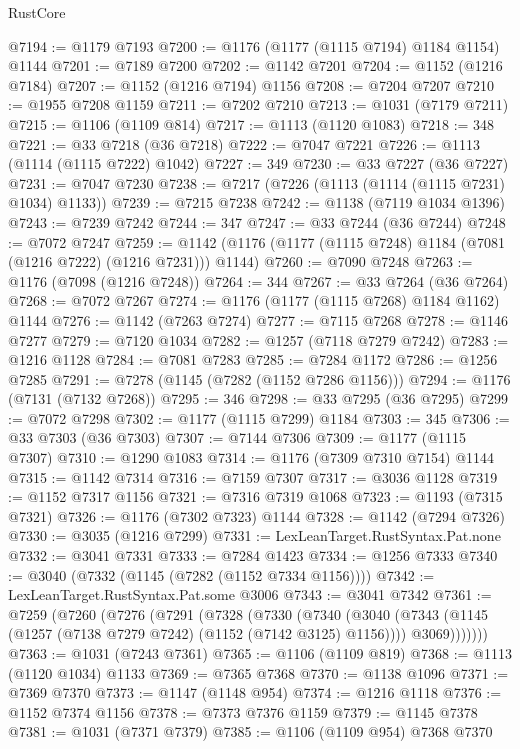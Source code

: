 \begin{lexlean}{RustCore}
\begin{coremodule}
@7194 := @1179 @7193
@7200 := @1176 (@1177 (@1115 @7194) @1184 @1154) @1144
@7201 := @7189 @7200
@7202 := @1142 @7201
@7204 := @1152 (@1216 @7184)
@7207 := @1152 (@1216 @7194) @1156
@7208 := @7204 @7207
@7210 := @1955 @7208 @1159
@7211 := @7202 @7210
@7213 := @1031 (@7179 @7211)
@7215 := @1106 (@1109 @814)
@7217 := @1113 (@1120 @1083)
@7218 := 348
@7221 := @33 @7218 (@36 @7218)
@7222 := @7047 @7221
@7226 := @1113 (@1114 (@1115 @7222) @1042)
@7227 := 349
@7230 := @33 @7227 (@36 @7227)
@7231 := @7047 @7230
@7238 := @7217 (@7226 (@1113 (@1114 (@1115 @7231) @1034) @1133))
@7239 := @7215 @7238
@7242 := @1138 (@7119 @1034 @1396)
@7243 := @7239 @7242
@7244 := 347
@7247 := @33 @7244 (@36 @7244)
@7248 := @7072 @7247
@7259 := @1142 (@1176 (@1177 (@1115 @7248) @1184 (@7081 (@1216 @7222) (@1216 @7231))) @1144)
@7260 := @7090 @7248
@7263 := @1176 (@7098 (@1216 @7248))
@7264 := 344
@7267 := @33 @7264 (@36 @7264)
@7268 := @7072 @7267
@7274 := @1176 (@1177 (@1115 @7268) @1184 @1162) @1144
@7276 := @1142 (@7263 @7274)
@7277 := @7115 @7268
@7278 := @1146 @7277
@7279 := @7120 @1034
@7282 := @1257 (@7118 @7279 @7242)
@7283 := @1216 @1128
@7284 := @7081 @7283
@7285 := @7284 @1172
@7286 := @1256 @7285
@7291 := @7278 (@1145 (@7282 (@1152 @7286 @1156)))
@7294 := @1176 (@7131 (@7132 @7268))
@7295 := 346
@7298 := @33 @7295 (@36 @7295)
@7299 := @7072 @7298
@7302 := @1177 (@1115 @7299) @1184
@7303 := 345
@7306 := @33 @7303 (@36 @7303)
@7307 := @7144 @7306
@7309 := @1177 (@1115 @7307)
@7310 := @1290 @1083
@7314 := @1176 (@7309 @7310 @7154) @1144
@7315 := @1142 @7314
@7316 := @7159 @7307
@7317 := @3036 @1128
@7319 := @1152 @7317 @1156
@7321 := @7316 @7319 @1068
@7323 := @1193 (@7315 @7321)
@7326 := @1176 (@7302 @7323) @1144
@7328 := @1142 (@7294 @7326)
@7330 := @3035 (@1216 @7299)
@7331 := LexLeanTarget.RustSyntax.Pat.none
@7332 := @3041 @7331
@7333 := @7284 @1423
@7334 := @1256 @7333
@7340 := @3040 (@7332 (@1145 (@7282 (@1152 @7334 @1156))))
@7342 := LexLeanTarget.RustSyntax.Pat.some @3006
@7343 := @3041 @7342
@7361 := @7259
    (@7260
      (@7276
        (@7291
          (@7328
            (@7330
              (@7340
                (@3040
                  (@7343 (@1145 (@1257 (@7138 @7279 @7242) (@1152 (@7142 @3125) @1156))))
                  @3069)))))))
@7363 := @1031 (@7243 @7361)
@7365 := @1106 (@1109 @819)
@7368 := @1113 (@1120 @1034) @1133
@7369 := @7365 @7368
@7370 := @1138 @1096
@7371 := @7369 @7370
@7373 := @1147 (@1148 @954)
@7374 := @1216 @1118
@7376 := @1152 @7374 @1156
@7378 := @7373 @7376 @1159
@7379 := @1145 @7378
@7381 := @1031 (@7371 @7379)
@7385 := @1106 (@1109 @954) @7368 @7370

\end{coremodule}
\end{lexlean}
